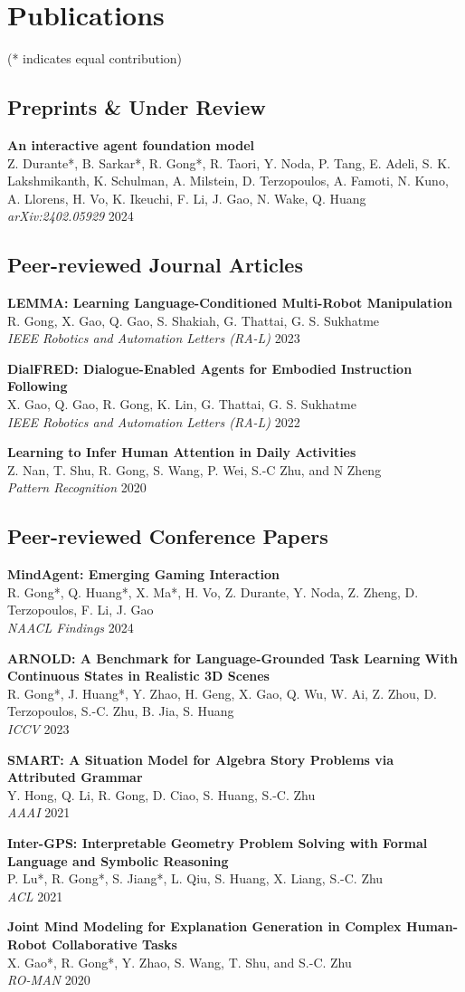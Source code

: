 \documentclass[11pt,a4paper]{article}
\newcommand{\publication}[4]{
  \textbf{#1} \\
  #2 \\
  \textit{#3} \hfill #4 \\
  \vspace{0.5em}
}
\begin{document}
\section*{Publications}
(* indicates equal contribution)

\subsection*{Preprints \& Under Review}
\publication{An interactive agent foundation model}{Z. Durante*, B. Sarkar*, R. Gong*, R. Taori, Y. Noda, P. Tang, E. Adeli, S. K. Lakshmikanth, K. Schulman, A. Milstein, D. Terzopoulos, A. Famoti, N. Kuno, A. Llorens, H. Vo, K. Ikeuchi, F. Li, J. Gao, N. Wake, Q. Huang}{arXiv:2402.05929}{2024}

\subsection*{Peer-reviewed Journal Articles}
\publication{LEMMA: Learning Language-Conditioned Multi-Robot Manipulation}{R. Gong, X. Gao, Q. Gao, S. Shakiah, G. Thattai, G. S. Sukhatme}{IEEE Robotics and Automation Letters (RA-L)}{2023}
\publication{DialFRED: Dialogue-Enabled Agents for Embodied Instruction Following}{X. Gao, Q. Gao, R. Gong, K. Lin, G. Thattai, G. S. Sukhatme}{IEEE Robotics and Automation Letters (RA-L)}{2022}
\publication{Learning to Infer Human Attention in Daily Activities}{Z. Nan, T. Shu, R. Gong, S. Wang, P. Wei, S.-C Zhu, and N Zheng}{Pattern Recognition}{2020}

\subsection*{Peer-reviewed Conference Papers}
\publication{MindAgent: Emerging Gaming Interaction}{R. Gong*, Q. Huang*, X. Ma*, H. Vo, Z. Durante, Y. Noda, Z. Zheng, D. Terzopoulos, F. Li, J. Gao}{NAACL Findings}{2024}
\publication{ARNOLD: A Benchmark for Language-Grounded Task Learning With Continuous States in Realistic 3D Scenes}{R. Gong*, J. Huang*, Y. Zhao, H. Geng, X. Gao, Q. Wu, W. Ai, Z. Zhou, D. Terzopoulos, S.-C. Zhu, B. Jia, S. Huang}{ICCV}{2023}
\publication{SMART: A Situation Model for Algebra Story Problems via Attributed Grammar}{Y. Hong, Q. Li, R. Gong, D. Ciao, S. Huang, S.-C. Zhu}{AAAI}{2021}
\publication{Inter-GPS: Interpretable Geometry Problem Solving with Formal Language and Symbolic Reasoning}{P. Lu*, R. Gong*, S. Jiang*, L. Qiu, S. Huang, X. Liang, S.-C. Zhu}{ACL}{2021}
\publication{Joint Mind Modeling for Explanation Generation in Complex Human-Robot Collaborative Tasks}{X. Gao*, R. Gong*, Y. Zhao, S. Wang, T. Shu, and S.-C. Zhu}{RO-MAN}{2020}
\end{document}
